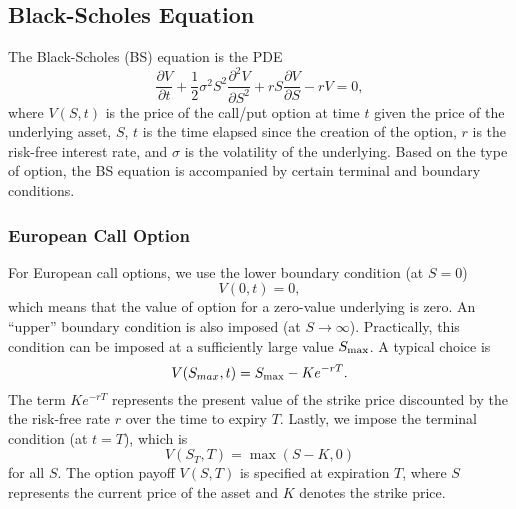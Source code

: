 \subsection{Black-Scholes Equation}\label{sec:bse}
The Black-Scholes (BS) equation is the PDE
\begin{equation}
\frac{\partial V}{\partial t} + \frac{1}{2} \sigma^2 S^2 \frac{\partial^2 V}{\partial S^2} + r S \frac{\partial V}{\partial S} - r V = 0, \label{eq:black-scholes}
\end{equation}
where \( V(S,t) \) is the price of the call/put option at time $t$ given the price of the underlying asset, $S$, 
$t$ is the time elapsed since the creation of the option, 
$r$ is the risk-free interest rate, and
$\sigma$ is the volatility of the underlying.
Based on the type of option, the BS equation is accompanied by certain terminal and boundary conditions.

\subsubsection{European Call Option}
For European call options, we use the lower boundary condition (at $S=0$)
\begin{equation}
        V(0,t) = 0, 
\end{equation}
which means that the value of option for a zero-value underlying is zero.
An ``upper'' boundary condition is also imposed (at $S \rightarrow  \infty$).
Practically, this condition can be imposed at a sufficiently
large value $S_{\rm max}$. A typical choice \cite{kwok_2008_derivatives} is 
\begin{equation}
        V(S_{max},t) = S_{\rm max} - Ke^{-rT}.
\end{equation}
The term $Ke^{-rT}$ represents the present value of the strike price discounted by the the risk-free
rate $r$ over the time to expiry $T$. Lastly, we impose the terminal condition (at $t = T$),
which is 
\begin{equation}
 V(S_T,T) = \max(S-K,0)   
\end{equation}
for all $S$.
The option payoff $V(S,T)$ is specified at expiration $T$,
where $S$ represents the current price of the asset and $K$ denotes the strike price.

